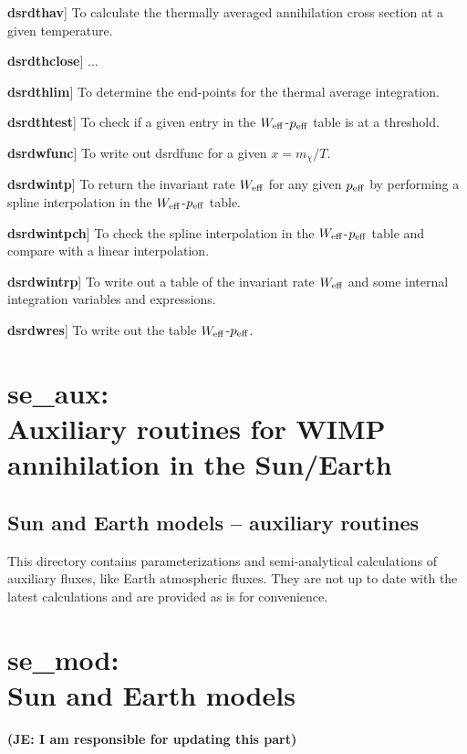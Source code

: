 \documentclass[a4paper,10pt,oneside]{book}
\newcommand{\joakim}[1]{{\color{red}\bf (JE: #1)}}
\newcommand{\codeb}[1]{\ftb{#1}}
\newenvironment{brief-subs}{\begin{list}{}{\setlength{\labelwidth}{2.5 cm}
\setlength{\labelsep}{0.5 cm} \setlength{\leftmargin}{3.0 cm}
\setlength{\itemsep}{0.5 ex} \setlength{\parsep}{0.0 cm}
\setlength{\topsep}{0.0 cm} \setlength{\parskip}{0.0 cm}}
\bsub{\rmfamily Routine} {\bfseries Purpose}
\raisebox{-0.5ex}{}\hrule
}{\end{list}
\hrule
\smallskip
}
\newcommand{\bitem}[1]{\makebox[2.5 cm][l]{\ftb{#1}}}
\newcommand{\bsub}[1]{\item[\bitem{#1}]}
\newcommand{\ft}[1]{\textsf{#1}}
\newcommand{\ftb}[1]{{\bfseries \sffamily #1}}
\begin{document}
\begin{brief-subs}
\bsub{dsrdthav}
  To calculate the thermally averaged annihilation
  cross section at a given temperature.
\bsub{dsrdthclose}
  ...
\bsub{dsrdthlim}
  To determine the end-points for the thermal
  average integration.
\bsub{dsrdthtest}
  To check if a given entry in the $W_{\rm
  eff}$-$p_{\rm eff}$ table is at a threshold.
\bsub{dsrdwfunc}
  To write out \ft{dsrdfunc} for a given $x=m_\chi/T$.
\bsub{dsrdwintp}
  To return the invariant rate $W_{\rm eff}$ for any
  given $p_{\rm eff}$ by performing a spline interpolation in the
  $W_{\rm eff}$-$p_{\rm eff}$ table.
\bsub{dsrdwintpch}
  To check the spline interpolation in the $W_{\rm
  eff}$-$p_{\rm eff}$ table and compare with a linear interpolation.
\bsub{dsrdwintrp}
  To write out a table of the invariant rate $W_{\rm
  eff}$ and some internal integration variables and expressions.
\bsub{dsrdwres}
  To write out the table $W_{\rm eff}$-$p_{\rm eff}$.
\end{brief-subs}

\chapter[se\_aux: Auxiliary routines for WIMP annihilation in the Sun/Earth]{\codeb{se\_aux}:\\ Auxiliary routines for WIMP annihilation in the Sun/Earth}
\label{ch:src/se_aux}

\section{Sun and Earth models -- auxiliary routines}

This directory contains parameterizations and semi-analytical calculations of auxiliary fluxes, like Earth atmospheric fluxes. They are not up to date with the latest calculations and are provided as is for convenience.

\chapter[se\_mod: Sun and Earth models]{\codeb{se\_mod}:\\ Sun and Earth models}
\label{ch:src/se_mod}

\joakim{I am responsible for updating this part}
\end{document}
